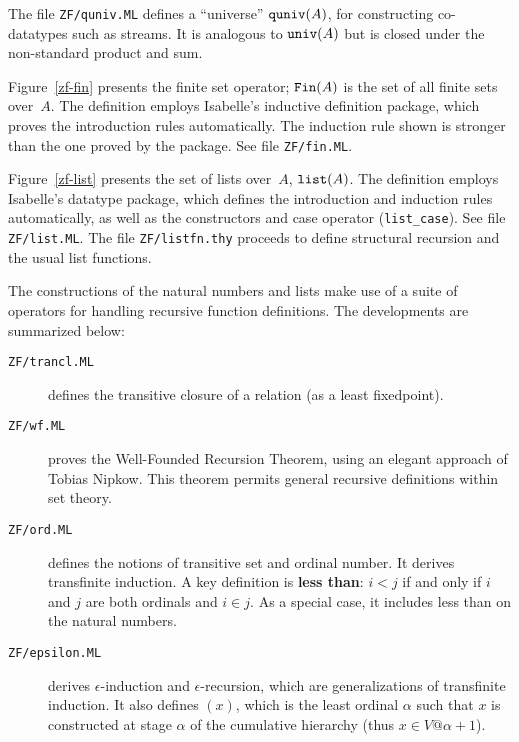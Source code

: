 The file {\tt ZF/quniv.ML} defines a ``universe'' ${\tt quniv}(A)$,
for constructing co-datatypes such as streams.  It is analogous to ${\tt
  univ}(A)$ but is closed under the non-standard product and sum.

Figure~\ref{zf-fin} presents the finite set operator; ${\tt Fin}(A)$ is the
set of all finite sets over~$A$.  The definition employs Isabelle's
inductive definition package, which proves the introduction rules
automatically.  The induction rule shown is stronger than the one proved by
the package.  See file {\tt ZF/fin.ML}.

Figure~\ref{zf-list} presents the set of lists over~$A$, ${\tt list}(A)$.
The definition employs Isabelle's datatype package, which defines the
introduction and induction rules automatically, as well as the constructors
and case operator (\verb|list_case|).  See file {\tt ZF/list.ML}.
The file {\tt ZF/listfn.thy} proceeds to define structural
recursion and the usual list functions.

The constructions of the natural numbers and lists make use of a suite of
operators for handling recursive function definitions.  The developments are
summarized below:
\begin{description}
\item[{\tt ZF/trancl.ML}]
defines the transitive closure of a relation (as a least fixedpoint).

\item[{\tt ZF/wf.ML}]
proves the Well-Founded Recursion Theorem, using an elegant
approach of Tobias Nipkow.  This theorem permits general recursive
definitions within set theory.

\item[{\tt ZF/ord.ML}] defines the notions of transitive set and
  ordinal number.  It derives transfinite induction.  A key definition is
  {\bf less than}: $i<j$ if and only if $i$ and $j$ are both ordinals and
  $i\in j$.  As a special case, it includes less than on the natural
  numbers.

\item[{\tt ZF/epsilon.ML}]
derives $\epsilon$-induction and $\epsilon$-recursion, which are
generalizations of transfinite induction.  It also defines
$(x)$, which is the least ordinal $\alpha$ such that $x$
is constructed at stage $\alpha$ of the cumulative hierarchy (thus $x\in
V@{\alpha+1}$).
\end{description}


